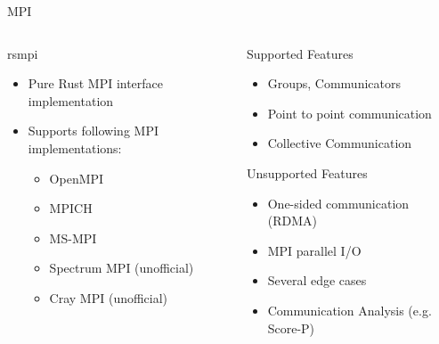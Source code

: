 \documentclass[compress,aspectratio=169]{beamer}
\begin{document}
\begin{frame}{MPI}
  \begin{columns}
    \begin{column}{0.5\textwidth}
      \begin{block}{rsmpi \cite{mpi}}
        \begin{itemize}
          \item Pure Rust MPI interface implementation
          \item Supports following MPI implementations:
            \begin{itemize}
              \item OpenMPI
              \item MPICH
              \item MS-MPI
              \item Spectrum MPI (unofficial)
              \item Cray MPI (unofficial)
            \end{itemize}
        \end{itemize}
      \end{block}
    \end{column}
    \pause
    \begin{column}{0.5\textwidth}
      \begin{block}{Supported Features}
        \begin{itemize}
          \item Groups, Communicators
          \item Point to point communication
          \item Collective Communication
        \end{itemize}
      \end{block}
      \pause
      \begin{block}{Unsupported Features}
        \begin{itemize}
          \item One-sided communication (RDMA)
          \item MPI parallel I/O
          \item Several edge cases
          \item Communication Analysis (e.g. Score-P)
        \end{itemize}
      \end{block}
    \end{column}
  \end{columns}
\end{frame}
\end{document}
